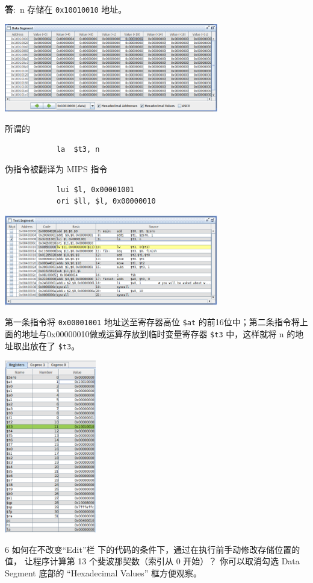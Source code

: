 \documentclass[12pt,a4paper]{article}
\newenvironment{problems}{\begin{list}{}{\renewcommand{\makelabel}[1]{\textbf{##1}.\hfil}}}{\end{list}}
\newenvironment{steps}{\begin{list}{}{\renewcommand{\makelabel}[1]{(##1)\hfil}}}{\end{list}}
\providecommand{\ans}{\textbf{答}:~}
\begin{document}
\begin{problems}
\begin{steps}
        \ans n 存储在 \verb"0x10010010" 地址。

        \includegraphics[width=0.7\textwidth]{ds.png}

        所谓的
        \begin{verbatim}
            la  $t3, n
        \end{verbatim}
        伪指令被翻译为 MIPS 指令
        \begin{verbatim}
            lui $l, 0x00001001
            ori $ll, $l, 0x00000010
        \end{verbatim}

        \includegraphics[width=0.7\textwidth]{ts.png}

        第一条指令将 \verb"0x00001001" 地址送至寄存器高位 \verb"$at" 的前16位中；第二条指令将上面的地址与0x00000010做或运算存放到临时变量寄存器 \verb"$t3" 中，这样就将 n 的地址取出放在了 \verb"$t3"。

        \includegraphics[width=0.3\textwidth]{reg.png}
        \item[6] 如何在不改变“Edit”栏 下的代码的条件下，通过在执行前手动修改存储位置的值，
        让程序计算第 13 个斐波那契数（索引从 0 开始）？ 你可以取消勾选 Data Segment
        底部的 “Hexadecimal Values” 框方便观察。


\end{steps}
\end{problems}
\end{document}
